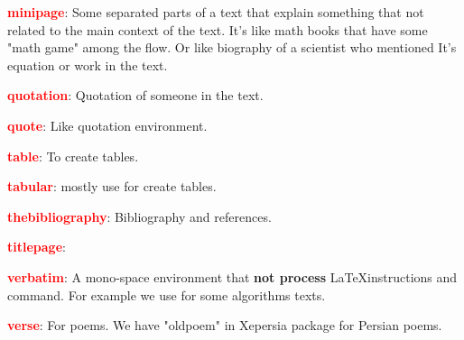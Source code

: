 \documentclass[12pt, a4paper, onecolumn]{article}
\begin{document}
\begin{description}
		\item \textbf{\textcolor{red}{minipage}}: Some separated parts of a text that explain something that not related to the main context of the text. It's like math books that have some "math game" among the flow. Or like biography of a scientist who mentioned It's equation or work in the text.
		
		\item \textbf{\textcolor{red}{quotation}}: Quotation of someone in the text.
		
		\item \textbf{\textcolor{red}{quote}}: Like quotation environment.
		
		\item \textbf{\textcolor{red}{table}}: To create tables.
		
		\item \textbf{\textcolor{red}{tabular}}: mostly use for create tables.
		
		\item \textbf{\textcolor{red}{thebibliography}}: Bibliography and references.
		
		\item \textbf{\textcolor{red}{titlepage}}: 
		
		\item \textbf{\textcolor{red}{verbatim}}: A mono-space environment that \textbf{not process} \LaTeX instructions and command. For example we use for some algorithms texts. 
		
		\item \textbf{\textcolor{red}{verse}}: For poems. We have "oldpoem" in Xepersia package for Persian poems.
		
	\end{description}
			
\end{document}
